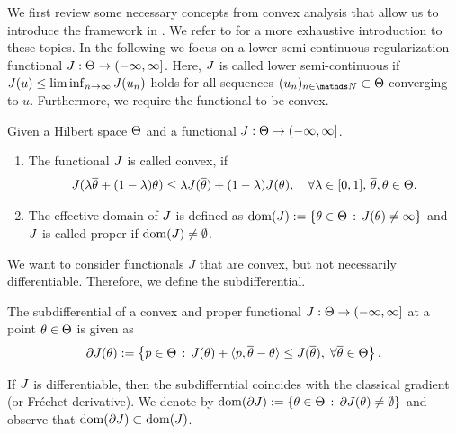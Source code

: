 We first review some necessary concepts from convex analysis that allow us to introduce the framework in \cite{bungert2022bregman}. We refer to \cite{benning2018modern, rockafellar1997convex, bauschke2011convex} for a more exhaustive introduction to these topics.
%
In the following we focus on a lower semi-continuous regularization functional $J:\Theta\to (-\infty,\infty]$. Here, $J$ is called lower semi-continuous if $J(u)\leq\liminf_{n\to\infty}J(u_n)$ holds for all sequences $(u_n)_{n\in\N}\subset\Param$ converging to $u$. Furthermore, we require the functional to be convex.
%
\begin{definition}{}{}
Given a Hilbert space $\Theta$ and a functional $J:\Theta\to(-\infty,\infty]$.
%
\begin{enumerate}
\item The functional $J$ is called convex, if
%
\begin{align}
    J(\lambda\overline{\theta}+(1-\lambda)\theta)\leq
    \lambda J(\overline{\theta})
    +(1-\lambda)J(\theta),\quad\forall\lambda\in[0,1],\,\overline{\theta},\theta\in\Theta.
\end{align}
%
\item The effective domain of $J$ is defined as $\operatorname{dom}(J):=\{\theta\in\Theta\,:\,J(\theta)\neq\infty\}$ and $J$ is called proper if $\operatorname{dom}(J)\neq\emptyset$.
\end{enumerate} 
\end{definition}
%
%
\noindent%
We want to consider functionals $J$ that are convex, but not necessarily differentiable. Therefore, we define the subdifferential.
%
\begin{definition}{}{}
The subdifferential of a convex {and proper} functional $J:\Theta\to(-\infty,\infty]$ at a point $\theta\in\Theta$ is given as
\begin{align}
\label{eq:subgrad}
    \partial J(\theta) := \left\lbrace p\in\Theta \,:\, J(\theta) + \langle p,\overline{\theta}-\theta \rangle \leq J(\overline{\theta}),\;\forall\overline{\theta}\in\Theta\right\rbrace.
\end{align}
\end{definition}
\noindent%
If $J$ is differentiable, then the subdifferntial coincides with the classical gradient (or Fr\'echet derivative). We denote by $\operatorname{dom}(\partial J):=\{\theta\in\Theta\,:\,\partial J(\theta)\neq\emptyset\}$ and observe that $\operatorname{dom}(\partial J)\subset\operatorname{dom}(J)$.

